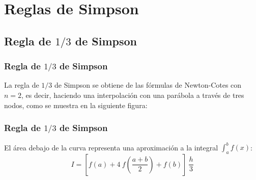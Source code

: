 \section{Reglas de Simpson}
\subsection{Regla de $1/3$ de Simpson}
\begin{frame}
\frametitle{Regla de $1/3$ de Simpson}
La regla de $1/3$ de Simpson se obtiene de las fórmulas de Newton-Cotes con $n = 2$, es decir, haciendo una interpolación con una parábola a través de tres nodos, como se muestra en la siguiente figura:
\begin{figure}
	\centering
	
\end{figure}
\end{frame}
\begin{frame}
\frametitle{Regla de $1/3$ de Simpson}
\begin{figure}
	\centering
	
\end{figure}
El área debajo de la curva representa una aproximación a la integral $\int_{a}^{b} f(x)$:
\[ I = \left[ f(a) + 4 \: f \left( \dfrac{a + b}{2} \right) + f(b) \right] \: \dfrac{h}{3} \]
\end{frame}
